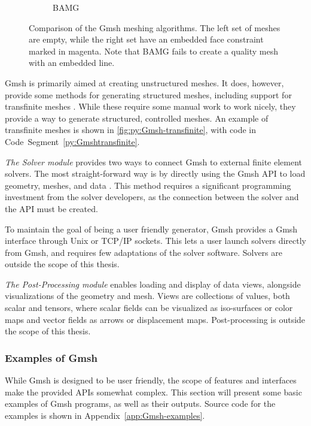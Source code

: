 \begin{figure}[p]
\begin{subfigure}[b]{\textwidth}
\begin{subfigure}[b]{0.32\textwidth}
        \end{subfigure}
        \caption{BAMG}
        \label{fig:Gmsh-BAMG}
    \end{subfigure}
    \caption[Comparison of the Gmsh meshing algorithms]{Comparison of the Gmsh meshing algorithms. The left set of meshes are empty, while the right set have an embedded face constraint marked in magenta. Note that BAMG fails to create a quality mesh with an embedded line.}
    \label{fig:Gmsh-meshing-algorithms}
\end{figure}

Gmsh is primarily aimed at creating unstructured meshes. It does, however, provide some methods for generating structured meshes, including support for transfinite meshes \cite{Gmsh_article}. While these require some manual work to work nicely, they provide a way to generate structured, controlled meshes. An example of transfinite meshes is shown in \autoref{fig:py:Gmsh-transfinite}, with code in Code~Segment~\ref{py:Gmshtransfinite}.

\emph{The Solver module} provides two ways to connect Gmsh to external finite element solvers. The most straight-forward way is by directly using the Gmsh API to load geometry, meshes, and data \cite{Gmsh_article}. This method requires a significant programming investment from the solver developers, as the connection between the solver and the API must be created.

To maintain the goal of being a user friendly generator, Gmsh provides a Gmsh interface through Unix or TCP/IP sockets. This lets a user launch solvers directly from Gmsh, and requires few adaptations of the solver software. Solvers are outside the scope of this thesis.

\emph{The Post-Processing module} enables loading and display of data views, alongside visualizations of the geometry and mesh. Views are collections of values, both scalar and tensors, where scalar fields can be visualized as iso-surfaces or color maps and vector fields as arrows or displacement maps. Post-processing is outside the scope of this thesis. 


\subsubsection{Examples of Gmsh}
\label{sec:Gmsh-examples}
While Gmsh is designed to be user friendly, the scope of features and interfaces make the provided APIs somewhat complex. This section will present some basic examples of Gmsh programs, as well as their outputs. Source code for the examples is shown in Appendix~\ref{app:Gmsh-examples}.

